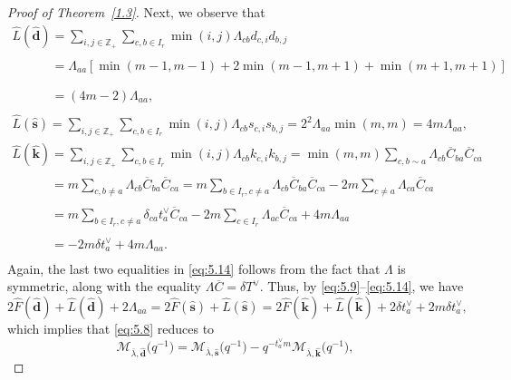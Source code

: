 \documentclass[pdftex]{sigma}
\numberwithin{equation}{section}
\begin{document}
\begin{proof}[Proof of Theorem~\ref{1.3}]
Next, we observe that
\begin{gather}%
\widehat{L}(\widehat{\mathbf{d}})
=\sum_{i,j\in\mathbb{Z}_+}\sum_{c,b\in I_r}\min(i,j)\Lambda_{cb}d_{c,i}d_{b,j}\nonumber\\
\phantom{\widehat{L}(\widehat{\mathbf{d}})}{}
=\Lambda_{aa}[\min(m-1,m-1)+2\min(m-1,m+1)+\min(m+1,m+1)]\nonumber\\
\phantom{\widehat{L}(\widehat{\mathbf{d}})}{}=(4m-2)\Lambda_{aa},\\
\widehat{L}(\widehat{\mathbf{s}})
=\sum_{i,j\in\mathbb{Z}_+}\sum_{c,b\in I_r}\min(i,j)\Lambda_{cb}s_{c,i}s_{b,j}
=2^2\Lambda_{aa}\min(m,m)
=4m\Lambda_{aa},\\
\widehat{L}(\widehat{\mathbf{k}})
=\sum_{i,j\in\mathbb{Z}_+}\sum_{c,b\in I_r}\min(i,j)\Lambda_{cb}k_{c,i}k_{b,j}
=\min(m,m)\sum_{c,b\sim a}\Lambda_{cb}\overline{C}_{ba}\overline{C}_{ca}\nonumber\\
\phantom{\widehat{L}(\widehat{\mathbf{k}})}{}
=m\sum_{c,b\neq a}\Lambda_{cb}\overline{C}_{ba}\overline{C}_{ca}
=m\sum_{b\in I_r,c\neq a}\Lambda_{cb}\overline{C}_{ba}\overline{C}_{ca}-2m\sum_{c\neq a}\Lambda_{ca}\overline{C}_{ca}\nonumber\\
\phantom{\widehat{L}(\widehat{\mathbf{k}})}{}=m\sum_{b\in I_r,c\neq a}\delta_{ca}t_a^{\vee}\overline{C}_{ca}-2m\sum_{c\in I_r}\Lambda_{ac}\overline{C}_{ca}+4m\Lambda_{aa}\nonumber\\
\phantom{\widehat{L}(\widehat{\mathbf{k}})}{}=-2m\delta t_a^{\vee}+4m\Lambda_{aa}.\label{eq:5.14}
\end{gather}
Again, the last two equalities in \eqref{eq:5.14} follows from the fact that $\Lambda$ is symmetric, along with the equality $\Lambda\overline{C}=\delta T^{\vee}$. Thus, by \eqref{eq:5.9}--\eqref{eq:5.14}, we have
\begin{equation*}
2\widehat{F}(\widehat{\mathbf{d}})+\widehat{L}(\widehat{\mathbf{d}})+2\Lambda_{aa}
=2\widehat{F}(\widehat{\mathbf{s}})+\widehat{L}(\widehat{\mathbf{s}})
=2\widehat{F}(\widehat{\mathbf{k}})+\widehat{L}(\widehat{\mathbf{k}})+2\delta t_a^{\vee}+2m\delta t_a^{\vee},
\end{equation*}
which implies that \eqref{eq:5.8} reduces to
\begin{equation*}
\mathcal{M}_{\overline{\lambda},\widehat{\mathbf{d}}}\bigl(q^{-1}\bigr)
=\mathcal{M}_{\overline{\lambda},\widehat{\mathbf{s}}}\bigl(q^{-1}\bigr)
-q^{-t_a^{\vee}m}\mathcal{M}_{\overline{\lambda},\widehat{\mathbf{k}}}\bigl(q^{-1}\bigr),
\end{equation*}

\end{proof}
\end{document}
